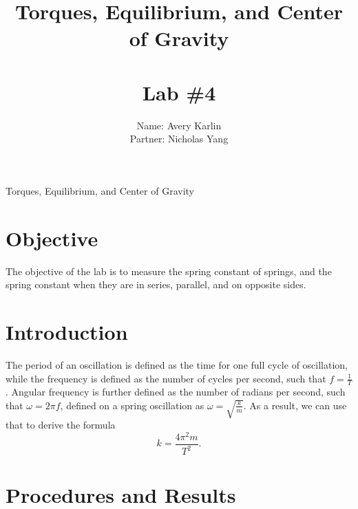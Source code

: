 \documentclass[11pt, titlepage]{article}
\title{Torques, Equilibrium, and Center of Gravity\\ \ \\ \large Lab \#4}
\author{Name: Avery Karlin \\ Partner: Nicholas Yang}
\date{}
\begin{document}
\maketitle

\begin{center}
\LARGE Torques, Equilibrium, and Center of Gravity
\end{center}

\section*{Objective}
The objective of the lab is to measure the spring constant of springs, and the spring constant when they are in series, parallel, and on opposite sides.

\section*{Introduction}
The period of an oscillation is defined as the time for one full cycle of oscillation, while the frequency is defined as the number of cycles per second, such that $f = \frac{1}{T}$. Angular frequency is further defined as the number of radians per second, such that $\omega = 2\pi f$, defined on a spring oscillation as $\omega = \sqrt{\frac{k}{m}}$. As a result, we can use that to derive the formula $$k = \frac{4\pi^2m}{T^2}.$$

\section*{Procedures and Results}
\end{document}
